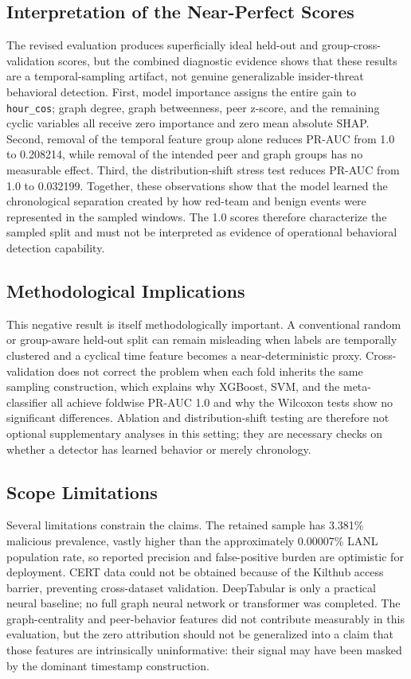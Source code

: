 \documentclass[journal]{IEEEtran}
\begin{document}
\subsection{Interpretation of the Near-Perfect Scores}
The revised evaluation produces superficially ideal held-out and group-cross-validation scores, but the combined diagnostic evidence shows that these results are a temporal-sampling artifact, not genuine generalizable insider-threat behavioral detection. First, model importance assigns the entire gain to \texttt{hour\_cos}; graph degree, graph betweenness, peer z-score, and the remaining cyclic variables all receive zero importance and zero mean absolute SHAP. Second, removal of the temporal feature group alone reduces PR-AUC from 1.0 to 0.208214, while removal of the intended peer and graph groups has no measurable effect. Third, the distribution-shift stress test reduces PR-AUC from 1.0 to 0.032199. Together, these observations show that the model learned the chronological separation created by how red-team and benign events were represented in the sampled windows. The 1.0 scores therefore characterize the sampled split and must not be interpreted as evidence of operational behavioral detection capability.

\subsection{Methodological Implications}
This negative result is itself methodologically important. A conventional random or group-aware held-out split can remain misleading when labels are temporally clustered and a cyclical time feature becomes a near-deterministic proxy. Cross-validation does not correct the problem when each fold inherits the same sampling construction, which explains why XGBoost, SVM, and the meta-classifier all achieve foldwise PR-AUC 1.0 and why the Wilcoxon tests show no significant differences. Ablation and distribution-shift testing are therefore not optional supplementary analyses in this setting; they are necessary checks on whether a detector has learned behavior or merely chronology.

\subsection{Scope Limitations}
Several limitations constrain the claims. The retained sample has 3.381\% malicious prevalence, vastly higher than the approximately 0.00007\% LANL population rate, so reported precision and false-positive burden are optimistic for deployment. CERT data could not be obtained because of the Kilthub access barrier, preventing cross-dataset validation. DeepTabular is only a practical neural baseline; no full graph neural network or transformer was completed. The graph-centrality and peer-behavior features did not contribute measurably in this evaluation, but the zero attribution should not be generalized into a claim that those features are intrinsically uninformative: their signal may have been masked by the dominant timestamp construction.
\end{document}

